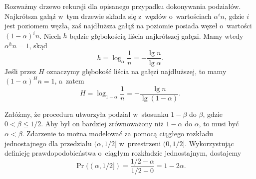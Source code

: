 \exercise %
Rozważmy drzewo rekursji dla opisanego przypadku dokonywania podziałów.
Najkrótsza gałąź w~tym drzewie składa się z~węzłów o~wartościach $\alpha^in$, gdzie $i$ jest poziomem węzła, zaś najdłuższa gałąź na  poziomie posiada węzeł o~wartości $(1-\alpha)^in$.
Niech $h$ będzie głębokością liścia najkrótszej gałęzi.
Mamy wtedy $\alpha^hn=1$, skąd
\[
	h = \log_\alpha\frac{1}{n} = -\frac{\lg n}{\lg\alpha}.
\]
Jeśli przez $H$ oznaczymy głębokość liścia na gałęzi najdłuższej, to mamy $(1-\alpha)^Hn=1$, a~zatem
\[
	H = \log_{1-\alpha}\frac{1}{n} = -\frac{\lg n}{\lg(1-\alpha)}.
\]

\exercise %
Załóżmy, że procedura  utworzyła podział w~stosunku $1-\beta$ do $\beta$, gdzie $0<\beta\le1/2$.
Aby był on bardziej zrównoważony niż $1-\alpha$ do $\alpha$, to musi być $\alpha<\beta$.
Zdarzenie to można modelować za pomocą ciągłego rozkładu jednostajnego dla przedziału $(\alpha,1/2]$ w~przestrzeni $(0,1/2]$.
Wykorzystując definicję prawdopodobieństwa o~ciągłym rozkładzie jednostajnym, dostajemy
\[
	\Pr((\alpha,1/2]) = \frac{1/2-\alpha}{1/2-0} = 1-2\alpha.
\]
